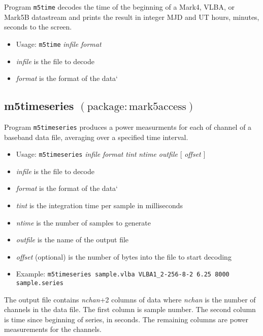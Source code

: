 Program {\tt m5time} decodes the time of the beginning of a Mark4, VLBA, or Mark5B datastream and prints the result in integer MJD and UT hours, minutes, seconds to the screen.

\begin{itemize}
\item[] Usage: {\tt m5time} {\em infile} {\em format}
\item[] {\em infile} is the file to decode
\item[] {\em format} is the format of the data`
\end{itemize}





\subsection{m5timeseries {\small $\mathrm{(package: mark5access)}$}} \label{sec:m5timeseries}

Program {\tt m5timeseries} produces a power measurments for each of channel of a baseband data file, averaging over a specified time interval.

\begin{itemize}
\item[] Usage: {\tt m5timeseries} {\em infile} {\em format} {\em tint} {\em ntime} {\em outfile} $[$ {\em offset} $]$
\item[] {\em infile} is the file to decode
\item[] {\em format} is the format of the data`
\item[] {\em tint} is the integration time per sample in milliseconds
\item[] {\em ntime} is the number of samples to generate
\item[] {\em outfile} is the name of the output file
\item[] {\em offset} (optional) is the number of bytes into the file to start decoding
\item[] Example: {\tt m5timeseries sample.vlba VLBA1\_2-256-8-2 6.25 8000 sample.series}
\end{itemize}

The output file contains {\em nchan}+2 columns of data where {\em nchan} is the number of channels in the data file.
The first column is sample number.
The second column is time since beginning of series, in seconds.
The remaining columns are power measurements for the channels.





